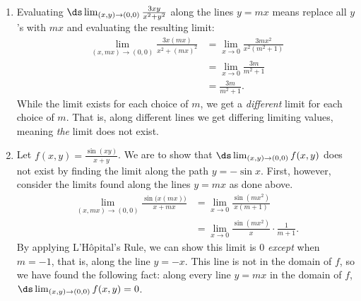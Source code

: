 {\mbox{}\\[-1.5\baselineskip]\begin{enumerate}
	\item Evaluating $\ds \lim_{(x,y)\to (0,0)} \frac{3xy}{x^2+y^2}$ along the lines $y=mx$ means replace all $y$'s with $mx$ and evaluating the resulting limit:
	\begin{align*}
	\lim_{(x,mx)\to (0,0)} \frac{3x(mx)}{x^2+(mx)^2} &=\lim_{x\to 0} \frac{3mx^2}{x^2(m^2+1)}\\
				&= \lim_{x\to 0} \frac{3m}{m^2+1}\\
				&= \frac{3m}{m^2+1}.
	\end{align*}
	While the limit exists for each choice of $m$, we get a \emph{different} limit for each choice of $m$. That is, along different lines we get differing limiting values, meaning \emph{the} limit does not exist.
	
	\item		Let $f(x,y) = \frac{\sin(xy)}{x+y}$. We are to show that $\ds \lim_{(x,y)\to (0,0)} f(x,y)$ does not exist by finding the limit along the path $y=-\sin x$. First, however, consider the limits found along the lines $y=mx$ as done above.
	\begin{align*}
	\lim_{(x,mx)\to (0,0)} \frac{\sin\big(x(mx)\big)}{x+mx} &= \lim_{x\to 0} \frac{\sin (mx^2)}{x(m+1)} \\
	&= \lim_{x\to 0} \frac{\sin(mx^2)}{x}\cdot\frac1{m+1}.
	\end{align*}
	By applying L'H\^opital's Rule, we can show this limit is 0 \emph{except} when $m=-1$, that is, along the line $y=-x$. This line is not in the domain of $f$, so we have found the following fact: along every line $y=mx$ in the domain of $f$, $\ds \lim_{(x,y)\to(0,0)} f(x,y)=0$. %
	

\end{enumerate}}
